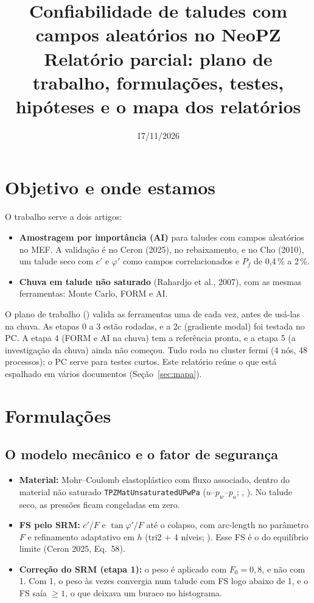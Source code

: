 \documentclass[11pt,a4paper]{article}
\title{Confiabilidade de taludes com campos aleatórios no NeoPZ\\\large Relatório parcial: plano de trabalho, formulações,
testes, hipóteses e o mapa dos relatórios}
\date{17/11/2026}
\begin{document}
\maketitle
\tableofcontents

\section{Objetivo e onde estamos}
O trabalho serve a dois artigos:
\begin{itemize}
  \item \textbf{Amostragem por importância (AI)} para taludes com campos aleatórios no MEF. A validação é no Ceron (2025),
    no rebaixamento, e no Cho (2010), um talude seco com $c'$ e $\varphi'$ como campos correlacionados e $P_f$ de 0,4\,\% a
    2\,\%.
  \item \textbf{Chuva em talude não saturado} (Rahardjo et al., 2007), com as mesmas ferramentas: Monte Carlo, FORM e AI.
\end{itemize}
O plano de trabalho () valida as ferramentas uma de cada vez, antes de usá-las
na chuva. As etapas 0 a 3 estão rodadas, e a 2c (gradiente modal) foi testada no PC. A etapa 4 (FORM e AI na chuva) tem
a referência pronta, e a etapa 5 (a investigação da chuva) ainda não começou. Tudo roda no cluster fermi (4 nós, 48
processos); o PC serve para testes curtos. Este relatório reúne o que está espalhado em vários documentos (Seção~\ref{sec:mapa}).

\section{Formulações}
\subsection{O modelo mecânico e o fator de segurança}
\begin{itemize}
  \item \textbf{Material:} Mohr--Coulomb elastoplástico com fluxo associado, dentro do material não saturado
    \texttt{TPZMatUnsaturatedUPwPa} ($u$--$p_w$--$p_a$; , ). No talude
    seco, as pressões ficam congeladas em zero.
  \item \textbf{FS pelo SRM:} $c'/F$ e $\tan\varphi'/F$ até o colapso, com arc-length no parâmetro $F$ e refinamento
    adaptativo em $h$ (tri2 + 4 níveis; ). Esse FS é o do equilíbrio limite (Ceron 2025, Eq.~58).
  \item \textbf{Correção do SRM (etapa 1):} o peso é aplicado com $F_0 = 0{,}8$, e não com 1. Com 1, o peso às vezes
    convergia num talude com FS logo abaixo de 1, e o FS saía $\ge 1$, o que deixava um buraco no histograma.
\end{itemize}
\end{document}
